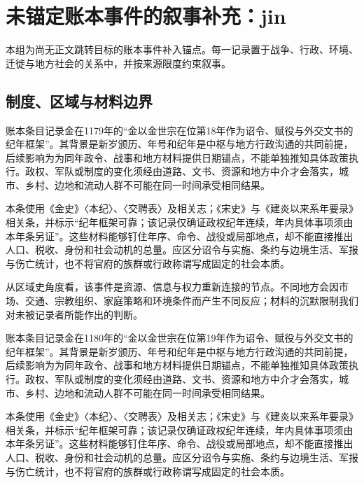 \section{未锚定账本事件的叙事补充：jin}

\label{sec:anchor-batch-two-jin}

本组为尚无正文跳转目标的账本事件补入锚点。每一记录置于战争、行政、环境、迁徙与地方社会的关系中，并按来源限度约束叙事。

\subsection{制度、区域与材料边界}

账本条目记录金在1179年的“金以金世宗在位第18年作为诏令、赋役与外交文书的纪年框架”。其背景是新岁颁历、年号和纪年是中枢与地方行政沟通的共同前提，后续影响为为同年政令、战事和地方材料提供日期锚点，不能单独推知具体政策执行。政权、军队或制度的变化须经由道路、文书、资源和地方中介才会落实，城市、乡村、边地和流动人群不可能在同一时间承受相同结果。

本条使用《金史》〈本纪〉、〈交聘表〉及相关志；《宋史》与《建炎以来系年要录》相关条，并标示“纪年框架可靠；该记录仅确证政权纪年连续，年内具体事项须由本年条另证”。这些材料能够钉住年序、命令、战役或局部地点，却不能直接推出人口、税收、身份和社会动机的总量。应区分诏令与实施、条约与边境生活、军报与伤亡统计，也不将官府的族群或行政称谓写成固定的社会本质。

从区域史角度看，该事件是资源、信息与权力重新连接的节点。不同地方会因市场、交通、宗教组织、家庭策略和环境条件而产生不同反应；材料的沉默限制我们对未被记录者所能作出的判断。

账本条目记录金在1180年的“金以金世宗在位第19年作为诏令、赋役与外交文书的纪年框架”。其背景是新岁颁历、年号和纪年是中枢与地方行政沟通的共同前提，后续影响为为同年政令、战事和地方材料提供日期锚点，不能单独推知具体政策执行。政权、军队或制度的变化须经由道路、文书、资源和地方中介才会落实，城市、乡村、边地和流动人群不可能在同一时间承受相同结果。

本条使用《金史》〈本纪〉、〈交聘表〉及相关志；《宋史》与《建炎以来系年要录》相关条，并标示“纪年框架可靠；该记录仅确证政权纪年连续，年内具体事项须由本年条另证”。这些材料能够钉住年序、命令、战役或局部地点，却不能直接推出人口、税收、身份和社会动机的总量。应区分诏令与实施、条约与边境生活、军报与伤亡统计，也不将官府的族群或行政称谓写成固定的社会本质。

